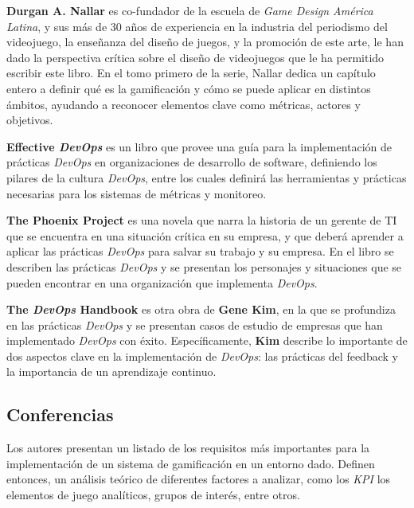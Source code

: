 \documentclass[journal]{IEEEtran}
\begin{document}
\cite{nallar2015estructuraludica} \textbf{Durgan A. Nallar} es co-fundador de la escuela de \textit{Game Design América Latina}, y sus más de 30 años de experiencia en la industria del periodismo del videojuego, la enseñanza del diseño de juegos, y la promoción de este arte, le han dado la perspectiva crítica sobre el diseño de videojuegos que le ha permitido escribir este libro. En el tomo primero de la serie, Nallar dedica un capítulo entero a definir qué es la gamificación y cómo se puede aplicar en distintos ámbitos, ayudando a reconocer elementos clave como métricas, actores y objetivos.

\cite{davis2016effective} \textbf{Effective \textit{DevOps}} es un libro que provee una guía para la implementación de prácticas \textit{DevOps} en organizaciones de desarrollo de software, definiendo los pilares de la cultura \textit{DevOps}, entre los cuales definirá las herramientas y prácticas necesarias para los sistemas de métricas y monitoreo.

\cite{kim2018phoenix} \textbf{The Phoenix Project} es una novela que narra la historia de un gerente de TI que se encuentra en una situación crítica en su empresa, y que deberá aprender a aplicar las prácticas \textit{DevOps} para salvar su trabajo y su empresa. En el libro se describen las prácticas \textit{DevOps} y se presentan los personajes y situaciones que se pueden encontrar en una organización que implementa \textit{DevOps}.

\cite{kim2021devops} \textbf{The \textit{DevOps} Handbook} es otra obra de \textbf{Gene Kim}, en la que se profundiza en las prácticas \textit{DevOps} y se presentan casos de estudio de empresas que han implementado \textit{DevOps} con éxito. Específicamente, \textbf{Kim} describe lo importante de dos aspectos clave en la implementación de \textit{DevOps}: las prácticas del feedback y la importancia de un aprendizaje continuo.

\subsection{\textbf{\large Conferencias}}

\cite{heilbrunn2014towards} Los autores presentan un listado de los requisitos más importantes para la implementación de un sistema de gamificación en un entorno dado. Definen entonces, un análisis teórico de diferentes factores a analizar, como los \textit{KPI} los elementos de juego analíticos, grupos de interés, entre otros.
\end{document}
